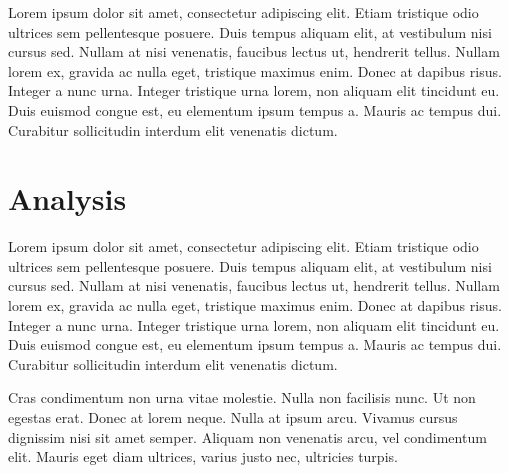 \documentclass[11pt, a4paper]{resources/JTH}
\begin{document}
    Lorem ipsum dolor sit amet, consectetur adipiscing elit. Etiam tristique odio ultrices sem pellentesque posuere. Duis tempus aliquam elit, at vestibulum nisi cursus sed. Nullam at nisi venenatis, faucibus lectus ut, hendrerit tellus. Nullam lorem ex, gravida ac nulla eget, tristique maximus enim. Donec at dapibus risus. Integer a nunc urna. Integer tristique urna lorem, non aliquam elit tincidunt eu. Duis euismod congue est, eu elementum ipsum tempus a. Mauris ac tempus dui. Curabitur sollicitudin interdum elit venenatis dictum.

\section{Analysis}
\label{chap:Analysis}

    Lorem ipsum dolor sit amet, consectetur adipiscing elit. Etiam tristique odio ultrices sem pellentesque posuere. Duis tempus aliquam elit, at vestibulum nisi cursus sed. Nullam at nisi venenatis, faucibus lectus ut, hendrerit tellus. Nullam lorem ex, gravida ac nulla eget, tristique maximus enim. Donec at dapibus risus. Integer a nunc urna. Integer tristique urna lorem, non aliquam elit tincidunt eu. Duis euismod congue est, eu elementum ipsum tempus a. Mauris ac tempus dui. Curabitur sollicitudin interdum elit venenatis dictum.
    
    Cras condimentum non urna vitae molestie. Nulla non facilisis nunc. Ut non egestas erat. Donec at lorem neque. Nulla at ipsum arcu. Vivamus cursus dignissim nisi sit amet semper. Aliquam non venenatis arcu, vel condimentum elit. Mauris eget diam ultrices, varius justo nec, ultricies turpis.

\newpage
\printbibliography
\end{document}
